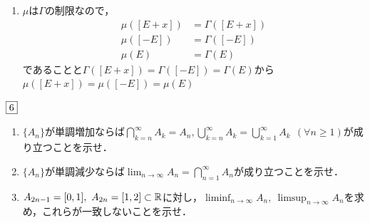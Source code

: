 \documentclass[dvipdfmx, leqno]{jsreport}
\begin{document}
\begin{souanswer}
\begin{enumerate}
    \item $\mu$は$\Gamma$の制限なので，
\begin{align}
    \mu([E+ x])&= \Gamma([E+ x])\\
    \mu([-E])&= \Gamma([-E])\\
    \mu(E)&= \Gamma(E)
\end{align}
    であることと$\Gamma([E+ x])= \Gamma([-E])= \Gamma(E)$から$\mu([E+ x])= \mu([-E])= \mu(E)$
\end{enumerate}
\end{souanswer}
\begin{tcolorbox}$\fbox{6}$
\begin{enumerate}
    \item $\{A_n\}$が単調増加ならば$\bigcap_{k= n}^\infty A_k= A_n, \bigcup_{k= n}^\infty A_k= \bigcup_{k= 1}^\infty A_k\ \ (\forall n\ge 1)$が成り立つことを示せ．
    \item $\{A_n\}$が単調減少ならば$\lim_{n\to \infty} A_n= \bigcap_{n= 1}^\infty A_n$が成り立つことを示せ．
    \item $A_{2n- 1}= [0, 1],\ A_{2n}= [1, 2]\subset \mathbb{R}$に対し，$\liminf_{n\to \infty} A_n,\ \limsup_{n\to \infty} A_n$を求め，これらが一致しないことを示せ．
\end{enumerate}
\end{tcolorbox}
\end{document}
